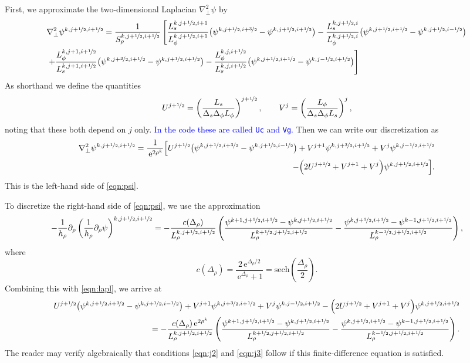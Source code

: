 \documentclass[11pt]{article}
\newcommand{\dy}{\partial}
\newcommand{\dr}{\Delta_\rho}
\newcommand{\ds}{\Delta_s}
\newcommand{\dph}{\Delta_\phi}
\newcommand{\half}{\nicefrac{1}{2}}
\newcommand{\thr}{\nicefrac{3}{2}}
\newcommand{\ex}{\,\mathrm{e}}
\begin{document}
First, we approximate the two-dimensional Laplacian $\nabla^2_\perp\psi$ by
\begin{align*}
&\nabla^2_\perp\psi^{k,j+\half,i+\half} = \frac{1}{S_\rho^{k,j+\half,i+\half}}\left[
\frac{L_s^{k,j+\half,i+1}}{L_\phi^{k,j+\half,i+1}}\big(\psi^{k,j+\half,i+\thr} - \psi^{k,j+\half,i+\half}\big) -
\frac{L_s^{k,j+\half,i}}{L_\phi^{k,j+\half,i}}\big(\psi^{k,j+\half,i+\half} - \psi^{k,j+\half,i-\half}\big) \right.\nonumber\\
&\left. +
 \frac{L_\phi^{k,j+1,i+\half}}{L_s^{k,j+1,i+\half}}\big(\psi^{k,j+\thr,i+\half} - \psi^{k,j+\half,i+\half}\big) - \frac{L_\phi^{k,j,i+\half}}{L_s^{k,j,i+\half}}\big(\psi^{k,j+\half,i+\half} - \psi^{k,j-\half,i+\half}\big)
 \right]
\end{align*}
As shorthand we define the quantities
\[
U^{j+\half} = \left(\frac{L_s}{\ds\dph L_\phi}\right)^{j+\half}, \qquad V^j = \left(\frac{L_\phi}{\ds\dph L_s}\right)^j,
\]
noting that these both depend on $j$ only. \textcolor{blue}{In the code these are called \texttt{Uc} and \texttt{Vg}.} Then we can write our discretization as
\begin{align}
\nabla^2_\perp\psi^{k,j+\half,i+\half}  = \frac{1}{\ex^{2\rho^k}}\Big[U^{j+\half}\big(\psi^{k,j+\half,i+\thr} - \psi^{k,j+\half,i-\half} \big) + V^{j+1}\psi^{k,j+\thr,i+\half} + V^{j}\psi^{k,j-\half,i+\half}\nonumber\\
 - \Big(2U^{j+\half} + V^{j+1} + V^{j}\Big)\psi^{k,j+\half,i+\half}\Big].
 \label{eqn:lapl}
\end{align}
This is the left-hand side of \eqref{eqn:psi}.

To discretize the right-hand side of \eqref{eqn:psi}, we use the approximation
\begin{align}
-\frac{1}{h_\rho}\dy_\rho\left(\frac{1}{h_\rho}\dy_\rho\psi\right)^{k,j+\half,i+\half} = -\frac{c(\dr)}{L_\rho^{k,j+\half,i+\half}}\left(\frac{\psi^{k+1,j+\half,i+\half} - \psi^{k,j+\half,i+\half}}{L_\rho^{k+\half,j+\half,i+\half}} - \frac{\psi^{k,j+\half,i+\half} - \psi^{k-1,j+\half,i+\half}}{L_\rho^{k-\half,j+\half,i+\half}} \right),
\end{align}
where
\[
c(\dr) = \frac{2\ex^{\dr/2}}{\ex^{\dr} + 1} = \mathrm{sech}\left(\frac{\dr}{2}\right).
\]
Combining this with \eqref{eqn:lapl}, we arrive at
\begin{align}
U^{j+\half}\big(\psi^{k,j+\half,i+\thr} - \psi^{k,j+\half,i-\half} \big) + V^{j+1}\psi^{k,j+\thr,i+\half} + V^{j}\psi^{k,j-\half,i+\half}
 - \Big(2U^{j+\half} + V^{j+1} + V^{j}\Big)\psi^{k,j+\half,i+\half}\nonumber\\
 = -\frac{c(\dr)\ex^{2\rho^k}}{L_\rho^{k,j+\half,i+\half}}\left(\frac{\psi^{k+1,j+\half,i+\half} - \psi^{k,j+\half,i+\half}}{L_\rho^{k+\half,j+\half,i+\half}} - \frac{\psi^{k,j+\half,i+\half} - \psi^{k-1,j+\half,i+\half}}{L_\rho^{k-\half,j+\half,i+\half}} \right).
 \label{eqn:main}
\end{align}
The reader may verify algebraically that conditions \eqref{eqn:j2} and \eqref{eqn:j3} follow if this finite-difference equation is satisfied.
\end{document}
